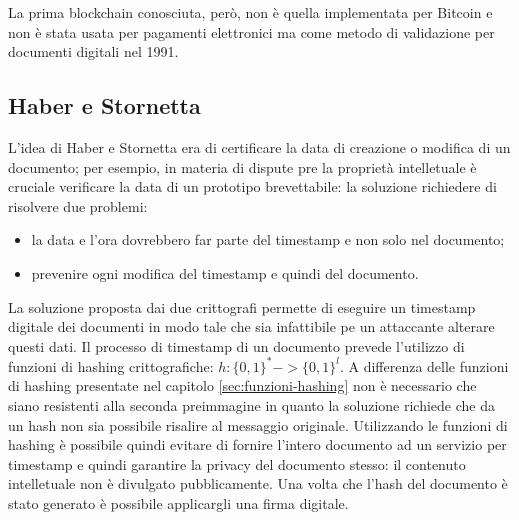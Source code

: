 La prima blockchain conosciuta, però, non è quella implementata per Bitcoin e non è stata usata per pagamenti elettronici ma come metodo di validazione per documenti digitali nel 1991.

\subsection{Haber e Stornetta}

L'idea di Haber e Stornetta\cite{haberstornetta} era di certificare la data di creazione o modifica di un documento; per esempio, in materia di dispute pre la proprietà intelletuale è cruciale verificare la data di un prototipo brevettabile: la soluzione richiedere di risolvere due problemi:
\begin{itemize}
    \item la data e l'ora dovrebbero far parte del timestamp e non solo nel documento;
    \item prevenire ogni modifica del timestamp e quindi del documento.
\end{itemize}
La soluzione proposta dai due crittografi permette di eseguire un timestamp digitale dei documenti in modo tale che sia infattibile pe un attaccante alterare questi dati.\newline
Il processo di timestamp di un documento prevede l'utilizzo di funzioni di hashing crittografiche: $h: \{0,1\}^* -> \{0,1\}^l$.\newline
A differenza delle funzioni di hashing presentate nel capitolo \ref{sec:funzioni-hashing} non è necessario che siano resistenti alla seconda preimmagine in quanto la soluzione richiede che da un hash non sia possibile risalire al messaggio originale.
Utilizzando le funzioni di hashing è possibile quindi evitare di fornire l'intero documento ad un servizio per timestamp e quindi garantire la privacy del documento stesso: il contenuto intelletuale non è divulgato pubblicamente.\newline
Una volta che l'hash del documento è stato generato è possibile applicargli una firma digitale.\newline


